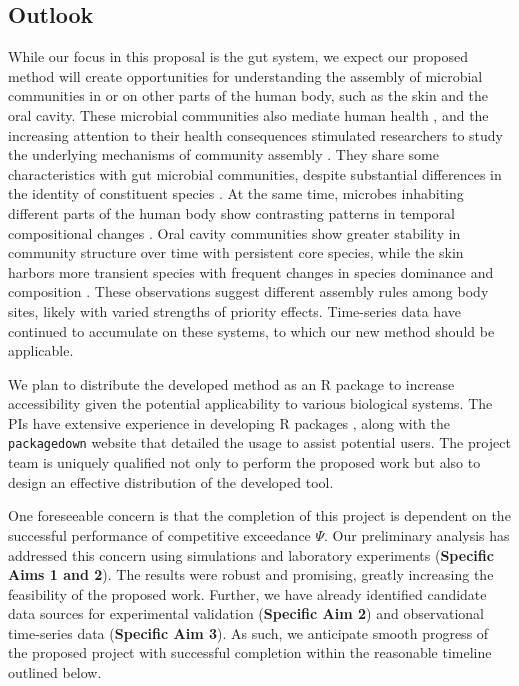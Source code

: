 \documentclass[12pt, class=article, crop=false]{standalone}
\begin{document}
\subsection*{Outlook}
While our focus in this proposal is the gut system, we expect our proposed method will create opportunities for understanding the assembly of microbial communities in or on other parts of the human body, such as the skin and the oral cavity.
These microbial communities also mediate human health \citep{fierer_animalcules_2012}, and the increasing attention to their health consequences stimulated researchers to study the underlying mechanisms of community assembly \citep{grice_topographical_2009, jakobsson_short-term_2010, costello_bacterial_2009, caporaso_moving_2011}.
They share some characteristics with gut microbial communities, despite substantial differences in the identity of constituent species \citep{costello_bacterial_2009}.
At the same time, microbes inhabiting different parts of the human body show contrasting patterns in temporal compositional changes \citep{costello_bacterial_2009, caporaso_moving_2011, fierer_animalcules_2012, jakobsson_short-term_2010}.
Oral cavity communities show greater stability in community structure over time with persistent core species, while the skin harbors more transient species with frequent changes in species dominance and composition \citep{costello_bacterial_2009}.
These observations suggest different assembly rules among body sites, likely with varied strengths of priority effects.
Time-series data have continued to accumulate on these systems, to which our new method should be applicable.

We plan to distribute the developed method as an R package to increase accessibility given the potential applicability to various biological systems.
The PIs have extensive experience in developing R packages \citep{terui_emergent_2021, terui_intentional_2023}, along with the \texttt{packagedown} website that detailed the usage to assist potential users.
The project team is uniquely qualified not only to perform the proposed work but also to design an effective distribution of the developed tool.

One foreseeable concern is that the completion of this project is dependent on the successful performance of competitive exceedance $\Psi$.
Our preliminary analysis has addressed this concern using simulations and laboratory experiments  (\textbf{Specific Aims 1 and 2}).
The results were robust and promising, greatly increasing the feasibility of the proposed work.
Further, we have already identified candidate data sources for experimental validation (\textbf{Specific Aim 2}) and observational time-series data (\textbf{Specific Aim 3}).
As such, we anticipate smooth progress of the proposed project with successful completion within the reasonable timeline outlined below.
\end{document}
